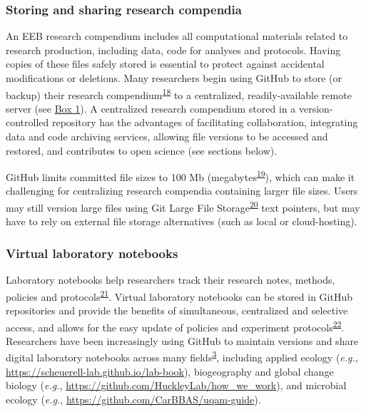 \hypertarget{storing-and-sharing-research-compendia}{%
\subsubsection{Storing and sharing research compendia}\label{storing-and-sharing-research-compendia}}

An EEB research compendium includes all computational materials related to research production, including data, code for analyses and protocols.
Having copies of these files safely stored is essential to protect against accidental modifications or deletions.
Many researchers begin using GitHub to store (or backup) their research compendium\textsuperscript{\protect\hyperlink{ref-MwwMapRG}{18}} to a centralized, readily-available remote server (see \protect\hyperlink{definitions}{Box 1}).
A centralized research compendium stored in a version-controlled repository has the advantages of facilitating collaboration, integrating data and code archiving services, allowing file versions to be accessed and restored, and contributes to open science (see sections below).

GitHub limits committed file sizes to 100 Mb (megabytes\textsuperscript{\protect\hyperlink{ref-1Co6ZZjF1}{19}}), which can make it challenging for centralizing research compendia containing larger file sizes.
Users may still version large files using Git Large File Storage\textsuperscript{\protect\hyperlink{ref-11GtZ7icJ}{20}} text pointers, but may have to rely on external file storage alternatives (such as local or cloud-hosting).

\hypertarget{virtual-laboratory-notebooks}{%
\subsubsection{Virtual laboratory notebooks}\label{virtual-laboratory-notebooks}}

Laboratory notebooks help researchers track their research notes, methods, policies and protocols\textsuperscript{\protect\hyperlink{ref-wwHxTOtm}{21}}.
Virtual laboratory notebooks can be stored in GitHub repositories and provide the benefits of simultaneous, centralized and selective access, and allows for the easy update of policies and experiment protocols\textsuperscript{\protect\hyperlink{ref-10V7x4H4l}{22}}.
Researchers have been increasingly using GitHub to maintain versions and share digital laboratory notebooks across many fields\textsuperscript{\protect\hyperlink{ref-10ghgV3S8}{3}}, including applied ecology (\emph{e.g.}, \url{https://scheuerell-lab.github.io/lab-book}), biogeography and global change biology (\emph{e.g.}, \url{https://github.com/HuckleyLab/how_we_work}), and microbial ecology (\emph{e.g.}, \url{https://github.com/CarBBAS/uqam-guide}).

